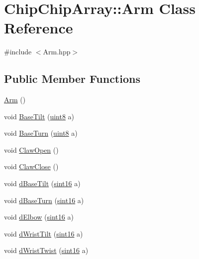 \hypertarget{classChipChipArray_1_1Arm}{\section{Chip\+Chip\+Array\+:\+:Arm Class Reference}
\label{classChipChipArray_1_1Arm}
}


{\ttfamily \#include $<$Arm.\+hpp$>$}

\subsection*{Public Member Functions}
\begin{DoxyCompactItemize}
\item 
\hyperlink{classChipChipArray_1_1Arm_aeda43d8461e50eaca9aa891ee2863c05}{Arm} ()
\item 
void \hyperlink{classChipChipArray_1_1Arm_a8b077a3791d9fc5ef285c1520fe4c5d8}{Base\+Tilt} (\hyperlink{definitions_8hpp_adde6aaee8457bee49c2a92621fe22b79}{uint8} a)
\item 
void \hyperlink{classChipChipArray_1_1Arm_addaedfe85ff2b14ff00c344fc4b40cd6}{Base\+Turn} (\hyperlink{definitions_8hpp_adde6aaee8457bee49c2a92621fe22b79}{uint8} a)
\item 
void \hyperlink{classChipChipArray_1_1Arm_abb33b5bb11034554d632f8c9b95b2c44}{Claw\+Open} ()
\item 
void \hyperlink{classChipChipArray_1_1Arm_a20c6fe3fe79c16f492a8c18b91427080}{Claw\+Close} ()
\item 
void \hyperlink{classChipChipArray_1_1Arm_af84b91c664baec0f2882dcf4089ae027}{d\+Base\+Tilt} (\hyperlink{definitions_8hpp_a74df79fde3c518e55b29ce6360a9c76e}{sint16} a)
\item 
void \hyperlink{classChipChipArray_1_1Arm_a980f5bd278cbe06aa21754fb8e0324b3}{d\+Base\+Turn} (\hyperlink{definitions_8hpp_a74df79fde3c518e55b29ce6360a9c76e}{sint16} a)
\item 
void \hyperlink{classChipChipArray_1_1Arm_ae8d0a664dd1a0e556cf40c0984035163}{d\+Elbow} (\hyperlink{definitions_8hpp_a74df79fde3c518e55b29ce6360a9c76e}{sint16} a)
\item 
void \hyperlink{classChipChipArray_1_1Arm_a43daba698f13a522887ad022b78557bb}{d\+Wrist\+Tilt} (\hyperlink{definitions_8hpp_a74df79fde3c518e55b29ce6360a9c76e}{sint16} a)
\item 
void \hyperlink{classChipChipArray_1_1Arm_a6bde822b1be63926e21222f36aad67b3}{d\+Wrist\+Twist} (\hyperlink{definitions_8hpp_a74df79fde3c518e55b29ce6360a9c76e}{sint16} a)

\end{DoxyCompactItemize}
